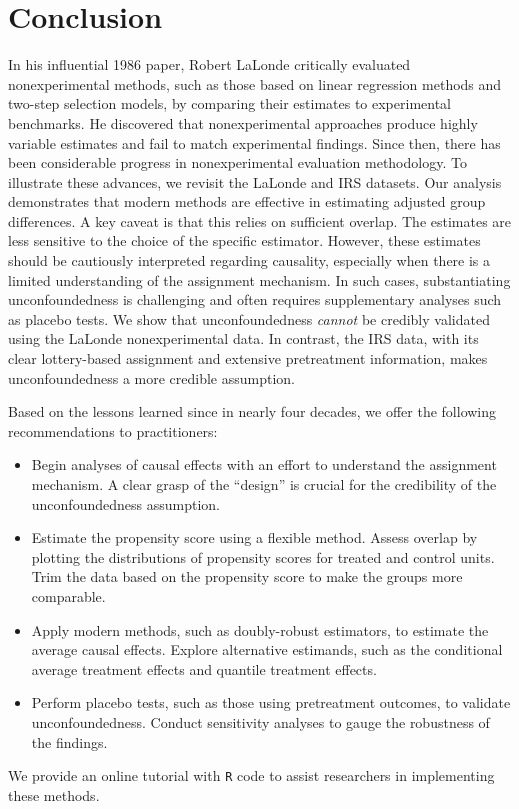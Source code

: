 \documentclass[letterpaper,12pt,leqno]{article}
\begin{document}
\section{Conclusion}\label{conclusion}

In his influential 1986 paper, Robert LaLonde critically evaluated nonexperimental methods, such as those based on linear regression methods and two-step selection models, by comparing their estimates to experimental benchmarks. He discovered that nonexperimental approaches produce highly variable estimates and fail to match experimental findings. Since then, there has been considerable progress in nonexperimental evaluation methodology. To illustrate these advances, we revisit the LaLonde and IRS datasets. Our analysis demonstrates that modern methods are effective in estimating adjusted group differences. A key caveat is that this relies on sufficient overlap. The estimates are less sensitive to the choice of the specific estimator. However, these estimates should be cautiously interpreted regarding causality, especially when there is a limited understanding of the assignment mechanism. In such cases, substantiating unconfoundedness is challenging and often requires supplementary analyses such as placebo tests. We show that unconfoundedness \emph{cannot} be credibly validated using the LaLonde nonexperimental data. In contrast, the IRS data, with its clear lottery-based assignment and extensive pretreatment information, makes unconfoundedness a more credible assumption.

Based on the lessons learned since \citet{LaLonde} in nearly four decades, we offer the following recommendations to practitioners: 
\begin{itemize}\itemsep0em
    \item Begin analyses of causal effects with an effort to understand the assignment mechanism. A clear grasp of the ``design'' is crucial for the credibility of the unconfoundedness assumption.
    \item Estimate the propensity score using a flexible method. Assess overlap by plotting the distributions of propensity scores for treated and control units. Trim the data based on the propensity score to make the groups more comparable. 
    \item Apply modern methods, such as doubly-robust estimators, to estimate the average causal effects. Explore alternative estimands, such as the conditional average treatment effects and quantile treatment effects. 
    \item Perform placebo tests, such as those using pretreatment outcomes, to validate unconfoundedness. Conduct sensitivity analyses to gauge the robustness of the findings. 
\end{itemize}
We provide an online tutorial with \texttt{R} code to assist researchers in implementing these methods.
\end{document}
